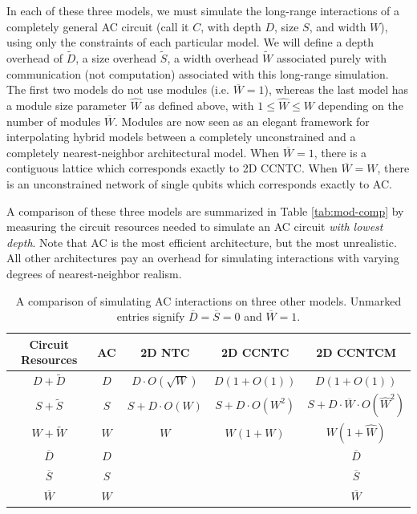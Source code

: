 In each of these three models, we must simulate the long-range
interactions of a completely general \textsf{AC} circuit (call it $C$, with
depth $D$, size $S$, and width $W$), using only the
constraints of each particular model. We will define a depth overhead
of $\tilde{D}$, a size overhead $\tilde{S}$, a width overhead $\tilde{W}$
associated purely with communication (not computation) associated with
this long-range simulation. The first two models do not use modules
(i.e. $\overline{W} = 1$),
whereas the last model has a module size parameter $\hat{W}$ as defined above, with $1 \le \hat{W} \le W$ depending on the number of modules
$\overline{W}$. Modules are now seen as an elegant framework for
interpolating hybrid models between a completely unconstrained and a completely nearest-neighbor architectural model. When $\overline{W} = 1$,
there is a contiguous lattice which corresponds exactly to \textsf{2D CCNTC}.
When $\overline{W} = W$, there is an unconstrained network of single qubits
which corresponds exactly to \textsf{AC}.

A comparison of these three models are
summarized in Table \ref{tab:mod-comp} by measuring the circuit resources
needed to simulate an \textsf{AC} circuit \emph{with lowest depth}.
Note that \textsf{AC} is
the most efficient architecture, but the most unrealistic. All other
architectures pay an overhead for simulating interactions with
varying degrees of nearest-neighbor realism.

\begin{table}
\begin{tabular}{|c|c|c|c|c|}
\hline
Circuit Resources & \textsf{AC} & \textsf{2D NTC} & \textsf{2D CCNTC} & \textsf{2D CCNTCM} \\
\hline
$D + \tilde{D}$ & $D$ & $D\cdot O(\sqrt{W})$    & $D(1 + O(1))$   & $D(1 + O(1))$ \\
$S + \tilde{S}$ & $S$ & $S + D\cdot O(W)$ & $S + D\cdot O(W^2)$ & $S + D\cdot \overline{W} \cdot O(\hat{W}^2)$ \\
$W + \tilde{W}$ & $W$ & $W$               & $W(1 + W)$    & $W(1 + \hat{W})$\\
\hline
$\overline{D}$  & $D$ &                   &               & $\overline{D}$\\
$\overline{S}$  & $S$ &                   &               & $\overline{S}$\\
$\overline{W}$  & $W$ &                   &               & $\overline{W}$\\
\hline
\end{tabular}
\caption{A comparison of simulating \textsf{AC} interactions on three
other models. Unmarked entries signify $\overline{D}=\overline{S} = 0$ and
$\overline{W} = 1$.}
\end{table}

